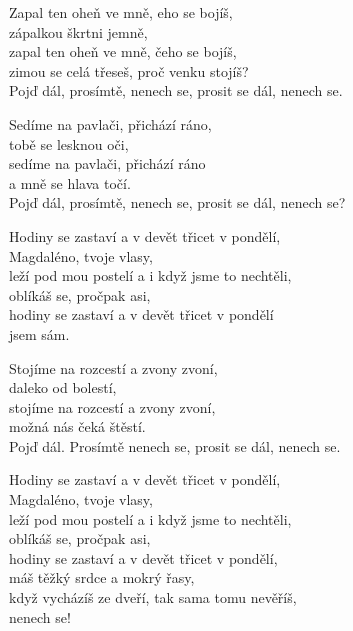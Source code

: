
\ve{}
Zapal ten oheň ve mně, eho se bojíš,\\
zápalkou škrtni jemně,\\
zapal ten oheň ve mně, čeho se bojíš,\\
zimou se celá třeseš, proč venku stojíš?\\
Pojď dál, prosímtě, nenech se, prosit se dál, \quad{} nenech se. 

\ve{}
Sedíme na pavlači, přichází ráno,\\
tobě se lesknou oči,\\
sedíme na pavlači, přichází ráno\\
a mně se hlava točí.\\
Pojď dál, prosímtě, nenech se, prosit se dál, \quad{} nenech se? 

\cho{}
Hodiny se zastaví a v devět třicet v pondělí,\\
Magdaléno, tvoje vlasy,\\
leží pod mou postelí a i když jsme to nechtěli,\\
oblíkáš se, pročpak asi,\\
hodiny se zastaví a v devět třicet v pondělí\\
jsem sám. 

\ve{}
Stojíme na rozcestí a zvony zvoní,\\
daleko od bolestí,\\
stojíme na rozcestí a zvony zvoní,\\
možná nás čeká štěstí.\\
Pojď dál. Prosímtě nenech se, prosit se dál, \quad{} nenech se. 

\cho{}

\cho{}
Hodiny se zastaví a v devět třicet v pondělí,\\
Magdaléno, tvoje vlasy,\\
leží pod mou postelí a i když jsme to nechtěli,\\
oblíkáš se, pročpak asi,\\
hodiny se zastaví a v devět třicet v pondělí,\\
máš těžký srdce a mokrý řasy,\\
když vycházíš ze dveří, tak sama tomu nevěříš,\\
nenech se! 

\esong{}